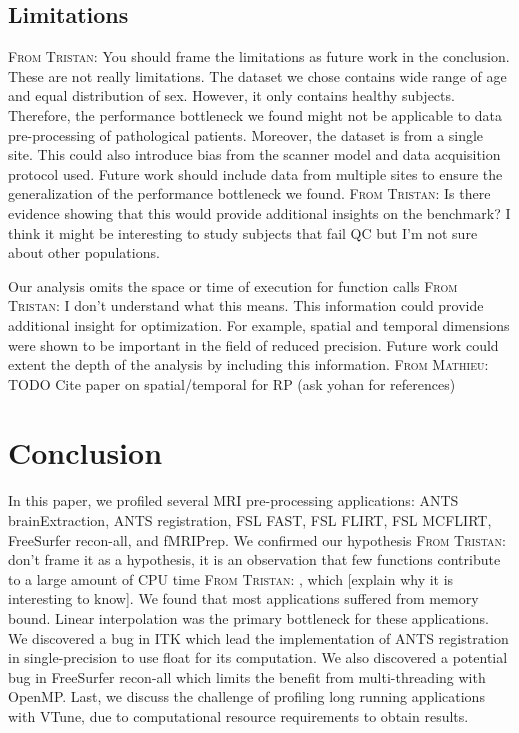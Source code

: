 \documentclass[conference]{IEEEtran}
\newcommand{\TG}[1]{\color{blue}\textsc{From Tristan: }#1\color{black}}
\newcommand{\MD}[1]{\color{magenta}\textsc{From Mathieu: }#1\color{black}}
\begin{document}
\subsection{Limitations}
\TG{You should frame the limitations as future work in the conclusion. These are not really limitations.}
The dataset we chose contains wide range of age and equal distribution of sex. However, it only contains healthy subjects. Therefore, the performance bottleneck we found might not be applicable to data pre-processing of pathological patients. Moreover, the dataset is from a single site. This could also introduce bias from the scanner model and data acquisition protocol used. Future work should include data from multiple sites to ensure the generalization of the performance bottleneck we found. \TG{Is there evidence showing that this would provide additional insights on the benchmark? I think it might be interesting to study subjects that fail QC but I'm not sure about other populations.}
			
Our analysis omits the space or time of execution for function calls \TG{I don't understand what this means}. This information could provide additional insight for optimization. For example, spatial and temporal dimensions were shown to be important in the field of reduced precision. Future work could extent the depth of the analysis by including this information.
\MD{TODO Cite paper on spatial/temporal for RP (ask yohan for references)}
			
\section{Conclusion}
In this paper, we profiled several MRI pre-processing applications: ANTS brainExtraction, ANTS registration, FSL FAST, FSL FLIRT, FSL MCFLIRT, FreeSurfer recon-all, and fMRIPrep. We confirmed our hypothesis \TG{don't frame it as a hypothesis, it is an observation} that few functions contribute to a large amount of CPU time \TG{, which [explain why it is interesting to know]}. We found that most applications suffered from memory bound. Linear interpolation was the primary bottleneck for these applications. We discovered a bug in ITK which lead the implementation of ANTS registration in single-precision to use float for its computation. We also discovered a potential bug in FreeSurfer recon-all which limits the benefit from multi-threading with OpenMP. Last, we discuss the challenge of profiling long running applications with VTune, due to computational resource requirements to obtain results.
\end{document}
